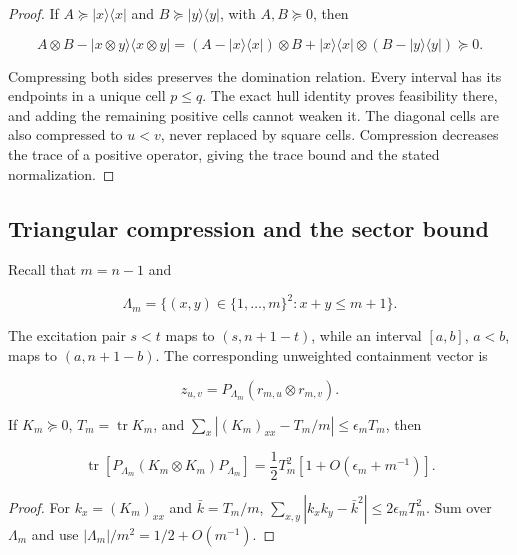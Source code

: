\begin{proof}
If \(A\succeq|x\rangle\langle x|\) and
\(B\succeq|y\rangle\langle y|\), with \(A,B\succeq0\), then

\[
 A\otimes B-|x\otimes y\rangle\langle x\otimes y|
 =(A-|x\rangle\langle x|)\otimes B
 +|x\rangle\langle x|\otimes
  (B-|y\rangle\langle y|)\succeq0.
\]

Compressing both sides preserves the domination relation. Every interval has
its endpoints in a unique cell \(p\le q\). The exact hull identity proves
feasibility there, and adding the remaining positive cells cannot weaken it.
The diagonal cells
are also compressed to \(u<v\), never replaced by square cells.  Compression
decreases the trace of a positive operator, giving the trace bound and the
stated normalization.
\end{proof}

\subsection{Triangular compression and the sector bound}

Recall that \(m=n-1\) and

\[
 \Lambda_m=\{(x,y)\in\{1,\ldots,m\}^2:x+y\le m+1\}.
\]

The excitation pair \(s<t\) maps to \((s,n+1-t)\), while an interval
\([a,b]\), \(a<b\), maps to \((a,n+1-b)\).  The corresponding unweighted
containment vector is

\begin{equation}\label{eq:supp-triangular-vector}
 z_{u,v}=P_{\Lambda_m}(r_{m,u}\otimes r_{m,v}).
\end{equation}

\begin{lemma}
\label{lem:supp-triangular-trace}
If \(K_m\succeq0\), \(T_m=\operatorname{tr}K_m\), and
\(\sum_x|(K_m)_{xx}-T_m/m|\le\epsilon_mT_m\), then

\begin{equation}\label{eq:supp-triangular-trace}
 \operatorname{tr}\!\left[
 P_{\Lambda_m}(K_m\otimes K_m)P_{\Lambda_m}\right]
 =\frac12T_m^2[1+O(\epsilon_m+m^{-1})].
\end{equation}
\end{lemma}

\begin{proof}
For \(k_x=(K_m)_{xx}\) and \(\bar k=T_m/m\),
\(\sum_{x,y}|k_xk_y-\bar k^2|\le2\epsilon_mT_m^2\).  Sum over
\(\Lambda_m\) and use \(|\Lambda_m|/m^2=1/2+O(m^{-1})\).
\end{proof}


